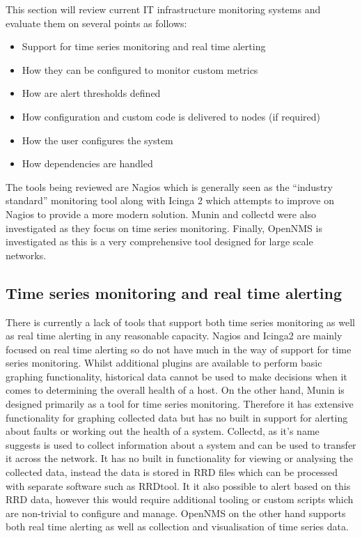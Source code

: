 \documentclass[bsc,deptreport,twoside,parskip,singlespacing,notimes]{infthesis}
\begin{document}
This section will review current IT infrastructure monitoring systems and
evaluate them on several points as follows:
\begin{itemize}
	\item Support for time series monitoring and real time alerting
	\item How they can be configured to monitor custom metrics
	\item How are alert thresholds defined
	\item How configuration and custom code is delivered to nodes (if required)
	\item How the user configures the system
	\item How dependencies are handled
\end{itemize}
The tools being reviewed are Nagios which is generally seen as the ``industry
standard'' monitoring tool along with Icinga 2 which attempts to improve on
Nagios to provide a more modern solution. Munin and collectd were also
investigated as they focus on time series monitoring. Finally, OpenNMS is
investigated as this is a very comprehensive tool designed for large scale
networks.


\subsection{Time series monitoring and real time alerting}

	There is currently a lack of tools that support both
	time series monitoring as well as real time alerting in any reasonable capacity.
	Nagios and Icinga2 are mainly focused on real time alerting so do not have much
	in the way of support for time series monitoring.  Whilst additional plugins are
	available to perform basic graphing functionality, historical data
	cannot be used to make decisions when it comes to determining the overall
	health of a host. On the other hand, Munin is designed primarily as a tool for time
	series monitoring.  Therefore it has extensive functionality for graphing
	collected data but has no built in support for alerting about faults or working
	out the health of a system. Collectd, as it's name suggests is used to collect
	information about a system and can be used to transfer it across the network. It
	has no built in functionality for viewing or analysing the collected data,
	instead the data is stored in RRD files which can be processed with separate
	software such as RRDtool.  It it also possible to alert based on this RRD data,
	however this would require additional tooling or custom scripts which are
	non-trivial to configure and manage.  OpenNMS on the other hand supports both
	real time alerting as well as collection and visualisation of time series data.
\end{document}
